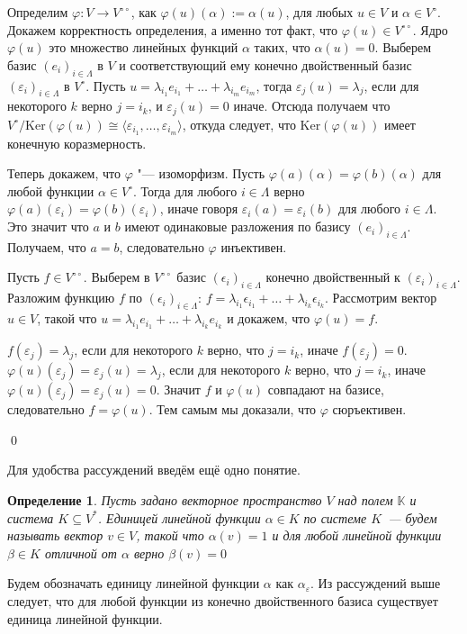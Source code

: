 \documentclass[12pt, reqno, a4paper, oneside, notitlepage]{amsart}
\makeatletter
\theoremstyle{mytheoremstyle}
\theoremstyle{myremarkstyle}
\newtheorem{definition}[theorem]{Определение}
\numberwithin{equation}{section}
\renewenvironment{proof}[1][\proofname]{\par\indent {\bfseries #1\@addpunct{.} }}{\qed}
\makeatother
\begin{document}
\begin{proof}
    Определим $\varphi: V \to V^{\circ\circ}$, как $\varphi(u)(\alpha):= \alpha(u)$, для любых $u \in V$ и $\alpha \in V^\circ$. 
    Докажем корректность определения, а именно тот факт, что $\varphi(u) \in V^{\circ\circ}$.
    Ядро $\varphi(u)$ это множество линейных функций $\alpha$ таких, что $\alpha(u) = 0$.
    Выберем базис $(e_i)_{i \in \Lambda}$ в $V$ и соответствующий ему конечно двойственный базис $(\varepsilon_i)_{i \in \Lambda}$ в $V^\circ$. Пусть $u = \lambda_{i_1}e_{i_1}+ \dots +\lambda_{i_m}e_{i_m}$, тогда $\varepsilon_j(u) = \lambda_j$, если для некоторого $k$ верно $j=i_k$, и 
    $\varepsilon_j(u)= 0$ иначе. Отсюда получаем что $V^\circ/\mathrm{Ker}(\varphi(u)) \cong \langle\varepsilon_{i_1}, \dots , \varepsilon_{i_m} \rangle$, откуда следует, что $\mathrm{Ker}(\varphi(u))$ имеет конечную коразмерность.

    Теперь докажем, что $\varphi$ "--- изоморфизм.
    Пусть $\varphi(a)(\alpha) = \varphi(b)(\alpha)$ для любой функции $\alpha \in V^\circ$. 
    Тогда для любого $i \in \Lambda$ верно $\varphi(a)(\varepsilon_i)= \varphi(b)(\varepsilon_i)$, иначе говоря $\varepsilon_i(a) = \varepsilon_i(b)$ для любого  $i \in \Lambda$. Это значит что $a$ и $b$ имеют одинаковые разложения по базису $(e_i)_{i \in \Lambda}$. Получаем, что $a = b$, следовательно $\varphi$ инъективен.

    Пусть $f \in V^{\circ\circ}$. Выберем в $V^{\circ\circ}$ базис $(\epsilon_i)_{i \in \Lambda}$ конечно двойственный к $(\varepsilon_i)_{i \in \Lambda}$. 
    Разложим функцию $f$ по $(\epsilon_i)_{i \in \Lambda}$: $f = \lambda_{i_1}\epsilon_{i_1} + \dots + \lambda_{i_k}\epsilon_{i_k}$. 
    Рассмотрим вектор $u \in V$, такой что $u = \lambda_{i_1}e_{i_1} + \dots + \lambda_{i_k}e_{i_k}$ и докажем, что $\varphi(u) = f$.
    
    $f(\varepsilon_j) = \lambda_j$, если для некоторого $k$ верно, что $j = i_k$, иначе $f(\varepsilon_j) = 0$. $\varphi(u)(\varepsilon_j) = \varepsilon_j(u) = \lambda_j$, если для некоторого $k$ верно, что $j = i_k$, иначе $\varphi(u)(\varepsilon_j) = \varepsilon_j(u) = 0$.
    Значит $f$ и $\varphi(u)$ совпадают на базисе, следовательно $f = \varphi(u)$. Тем самым мы доказали, что $\varphi$ сюръективен.
    
\end{proof}

Для удобства рассуждений введём ещё одно понятие.

\begin{definition}

Пусть задано векторное пространство $V$ над полем $\mathbb{K}$ и система $K \subseteq V^*$.
Единицей линейной функции $\alpha \in K$ по системе $K$~--- будем называть вектор $v\in V$, такой что $\alpha(v) = 1$ и для любой линейной функции $\beta \in K$ отличной от $\alpha$ верно $\beta(v) = 0$
\end{definition}
Будем обозначать единицу линейной функции $\alpha$ как $\alpha_\varepsilon$.
Из рассуждений выше следует, что для любой функции из конечно двойственного базиса существует единица линейной функции.
\end{document}
